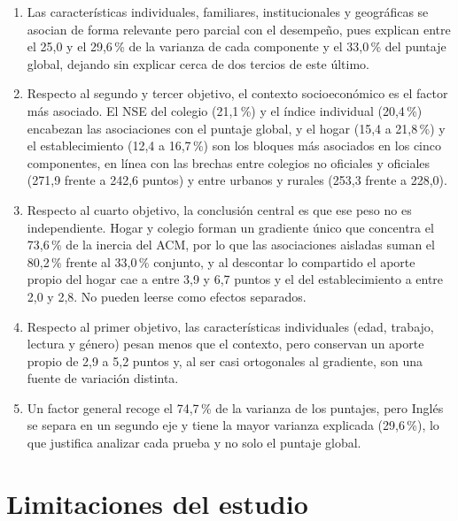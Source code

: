 \documentclass[12pt]{article}
\begin{document}
\begin{enumerate}[leftmargin=*,itemsep=2pt,topsep=2pt]
  \item Las características individuales, familiares, institucionales y geográficas se asocian de forma relevante pero parcial con el desempeño, pues explican entre el 25,0 y el 29,6\,\% de la varianza de cada componente y el 33,0\,\% del puntaje global, dejando sin explicar cerca de dos tercios de este último.

  \item Respecto al segundo y tercer objetivo, el contexto socioeconómico es el factor más asociado. El NSE del colegio (21,1\,\%) y el índice individual (20,4\,\%) encabezan las asociaciones con el puntaje global, y el hogar (15,4 a 21,8\,\%) y el establecimiento (12,4 a 16,7\,\%) son los bloques más asociados en los cinco componentes, en línea con las brechas entre colegios no oficiales y oficiales (271,9 frente a 242,6 puntos) y entre urbanos y rurales (253,3 frente a 228,0).

  \item Respecto al cuarto objetivo, la conclusión central es que ese peso no es independiente. Hogar y colegio forman un gradiente único que concentra el 73,6\,\% de la inercia del ACM, por lo que las asociaciones aisladas suman el 80,2\,\% frente al 33,0\,\% conjunto, y al descontar lo compartido el aporte propio del hogar cae a entre 3,9 y 6,7 puntos y el del establecimiento a entre 2,0 y 2,8. No pueden leerse como efectos separados.

  \item Respecto al primer objetivo, las características individuales (edad, trabajo, lectura y género) pesan menos que el contexto, pero conservan un aporte propio de 2,9 a 5,2 puntos y, al ser casi ortogonales al gradiente, son una fuente de variación distinta.

  \item Un factor general recoge el 74,7\,\% de la varianza de los puntajes, pero Inglés se separa en un segundo eje y tiene la mayor varianza explicada (29,6\,\%), lo que justifica analizar cada prueba y no solo el puntaje global.
\end{enumerate}

\vspace{0.1cm}

\section{Limitaciones del estudio}
\label{sec:limitaciones}
\end{document}
